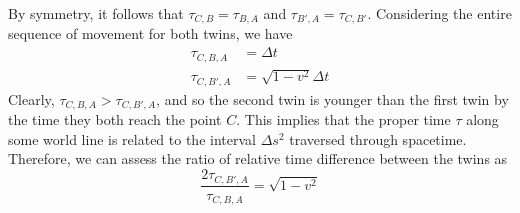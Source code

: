 \documentclass{article}
\begin{document}
\begin{exmp}
 			By symmetry, it follows that $\tau_{C,B} = \tau_{B,A}$ and $\tau_{B', A} = \tau_{C, B'}$. Considering the entire sequence of movement for both twins, we have
 			\begin{align*}
 				\tau_{C,B,A} &= \Delta t \\
 				\tau_{C,B',A} &= \sqrt{1 - v^2} \Delta t
 			\end{align*}
 			Clearly, $\tau_{C,B,A} > \tau_{C,B',A}$, and so the second twin is younger than the first twin by the time they both reach the point $C$. This implies that the proper time $\tau$ along some world line is related to the interval $\Delta s^2$ traversed through spacetime. Therefore, we can assess the ratio of relative time difference between the twins as 
 			$$ \frac{2 \tau_{C,B',A}}{\tau_{C,B,A}} = \sqrt{1-v^2} $$
 		\end{exmp}
 	\pagebreak
\end{document}
